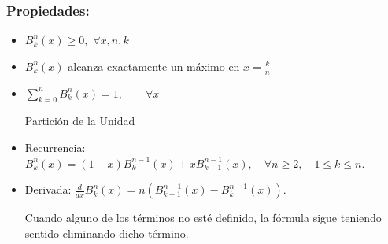 \documentclass[twoside]{report}
\newcommand{\colocapdf}[2]{\quad\pdfimage width #2 {pdfs/#1.pdf}}
\begin{document}
%
%
%
%
\subsubsection{Propiedades:}

\begin{itemize}
\item $B_k^n(x)\geq 0,$ \quad  \quad $\forall x,n,k$

\vspace{0.2cm}

\item $B_k^n(x)$ alcanza exactamente un máximo en $x=\frac{k}{n}$

\vspace{0.2cm}

\item $\sum_{k=0}^{n}B_k^n(x)=1, \quad\quad \forall x$

\vspace{0.2cm}

Partición de la Unidad

\vspace{0.2cm}

\item Recurrencia: $B_k^n(x)=(1-x)B_k^{n-1}(x)+xB_{k-1}^{n-1}(x), \quad \forall n\geq 2, \quad 1\leq k\leq n.$

\vspace{0.2cm}

\item Derivada: $\displaystyle \frac{d}{dx} B_k^n(x)= n( B_{k-1}^{n-1}(x)-B_k^{n-1}(x))$. 

Cuando alguno de los términos no esté definido, la fórmula sigue teniendo sentido eliminando dicho término.
\end{itemize}
\end{document}

